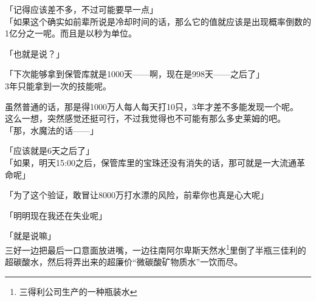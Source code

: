 「记得应该差不多，不过可能要早一点」\\

「如果这个确实如前辈所说是冷却时间的话，那么它的值就应该是出现概率倒数的1亿分之一呢。而且是以秒为单位。

「也就是说？」

「下次能够拿到保管库就是1000天——啊，现在是998天——之后了」\\

3年只能拿到一次的技能呢。

虽然普通的话，那是得1000万人每人每天打10只，3年才差不多能发现一个呢。\\

这么一想，突然感觉还挺可行，不过我觉得也不可能有那么多史莱姆的吧。\\

「那，水魔法的话——」

「应该就是6天之后了」\\

「如果，明天15:00之后，保管库里的宝珠还没有消失的话，那可就是一大流通革命呢」

「为了这个验证，敢冒让8000万打水漂的风险，前辈你也真是心大呢」

「明明现在我还在失业呢」

「就是说嘛」\\

三好一边把最后一口意面放进嘴，一边往南阿尔卑斯天然水\footnote{三得利公司生产的一种瓶装水}里倒了半瓶三佳利的超碳酸水，然后将弄出来的超廉价“微碳酸矿物质水”一饮而尽。\\

